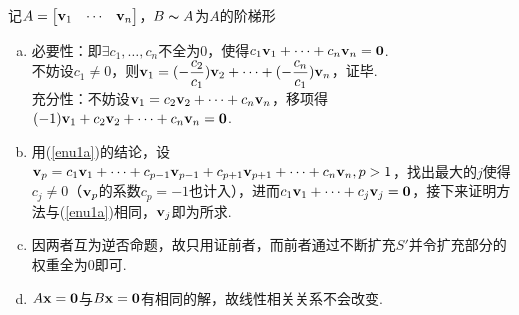 \begin{analysis}
记$A=\begin{bmatrix}{\mathbf{v}_1}&\cdots&{\mathbf{v}_n}\end{bmatrix}$，$B\thicksim A$为$A$的阶梯形
\begin{enumerate}[(a)]
	\item \label{enu1a}必要性：即$\exists c_1,\dots,c_n$不全为$0$，使得$c_1\mathbf{v}_1+\cdots+c_n\mathbf{v}_n=\mathbf{0}$.\\
	不妨设$c_1\ne 0$，则$\mathbf{v}_1=(-\dfrac{c_2}{c_1})\mathbf{v}_2+\cdots+(-\dfrac{c_n}{c_1})\mathbf{v}_n$，证毕.\\
	充分性：不妨设$\mathbf{v}_1=c_2\mathbf{v}_2+\cdots+c_n\mathbf{v}_n$，移项得$(-1)\mathbf{v}_1+c_2\mathbf{v}_2+\cdots+c_n\mathbf{v}_n=\mathbf{0}$.
	\item 用(\ref{enu1a})的结论，设$\mathbf{v}_p=c_1\mathbf{v}_1+\cdots+c_{p-1}\mathbf{v}_{p-1}+c_{p+1}\mathbf{v}_{p+1}+\cdots+c_n\mathbf{v}_n,p>1$，找出最大的$j$使得$c_j\ne 0$（$\mathbf{v}_p$的系数$c_p=-1$也计入），进而$c_1\mathbf{v}_1+\cdots+c_j\mathbf{v}_j=\mathbf{0}$，接下来证明方法与(\ref{enu1a})相同，$\mathbf{v}_j$即为所求.
	\item 因两者互为逆否命题，故只用证前者，而前者通过不断扩充$S'$并令扩充部分的权重全为$0$即可.
	\item $A\mathbf{x}=\mathbf{0}$与$B\mathbf{x}=\mathbf{0}$有相同的解，故线性相关关系不会改变.
\end{enumerate}
\end{analysis}

